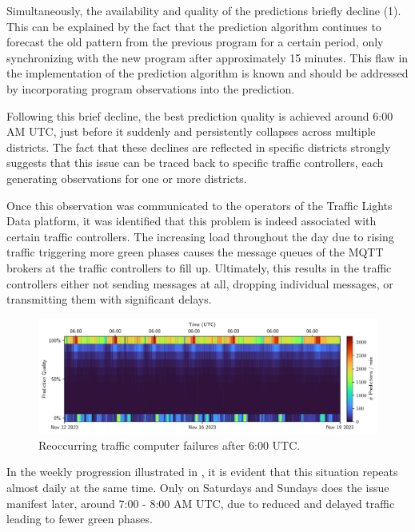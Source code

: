 Simultaneously, the availability and quality of the predictions briefly decline (1). This can be explained by the fact that the prediction algorithm continues to forecast the old pattern from the previous program for a certain period, only synchronizing with the new program after approximately 15 minutes. This flaw in the implementation of the prediction algorithm is known and should be addressed by incorporating program observations into the prediction.

Following this brief decline, the best prediction quality is achieved around 6:00 AM UTC, just before it suddenly and persistently collapses across multiple districts. The fact that these declines are reflected in specific districts strongly suggests that this issue can be traced back to specific traffic controllers, each generating observations for one or more districts. 

Once this observation was communicated to the operators of the Traffic Lights Data platform, it was identified that this problem is indeed associated with certain traffic controllers. The increasing load throughout the day due to rising traffic triggering more green phases causes the message queues of the MQTT brokers at the traffic controllers to fill up. Ultimately, this results in the traffic controllers either not sending messages at all, dropping individual messages, or transmitting them with significant delays.

\begin{figure}[t]
    \centering
    \includegraphics[width=\linewidth]{images/monitoring-7-days.pdf}
    \caption{Reoccurring traffic computer failures after 6:00 UTC.}\label{fig:monitoring-7-days}
\end{figure}

In the weekly progression illustrated in , it is evident that this situation repeats almost daily at the same time. Only on Saturdays and Sundays does the issue manifest later, around 7:00 - 8:00 AM UTC, due to reduced and delayed traffic leading to fewer green phases.

